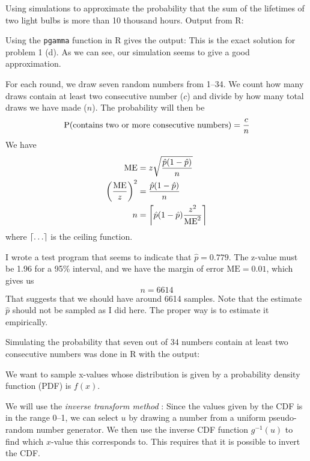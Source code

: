 \documentclass[a4paper,english,12pt]{article}
\begin{document}
Using simulations to approximate the probability that the sum of the lifetimes
of two light bulbs is more than 10 thousand hours. Output from R:

Using the \texttt{pgamma} function in R gives the output:
This is the exact solution for problem 1 (d). As we can see, our simulation
seems to give a good approximation.

For each round, we draw seven random numbers from 1--34. We count how many
draws contain at least two consecutive number ($c$) and divide by how many
total draws we have made ($n$). The probability will then be
\[
  \Prb(\text{contains two or more consecutive numbers}) = \frac{c}{n}
\]
We have
\begin{align*}
  \text{ME} &= z\sqrt{\frac{\hat{p}(1-\hat{p})}{n}} \\
  \left(\frac{\text{ME}}{z}\right)^2 &= \frac{\hat{p}(1-\hat{p})}{n} \\
  n &= \ceil*{ \hat{p}(1-\hat{p}) \frac{z^2}{\text{ME}^2} }
\end{align*}
where $\ceil{\dots}$ is the ceiling function.

I wrote a test program that seems to indicate that $\hat{p} = 0.779$. The
z-value must be 1.96 for a 95\%{} interval, and we have the margin of error
$\text{ME} = 0.01$, which gives us
\[
  n = 6614
\]
That suggests that we should have around 6614 samples. Note that the estimate
$\hat{p}$ should not be sampled as I did here. The proper way is to estimate it
empirically.

Simulating the probability that seven out of 34 numbers contain at least two
consecutive numbers was done in R with the output:

\label{problem:3a}
We want to sample x-values whose distribution is given by a probability density
function (PDF) is $f(x)$.

We will use the \textit{inverse transform method}
\cite{wiki:inverse.transform.method}: Since the values given by the CDF is in
the range 0--1, we can select $u$ by drawing a number from a uniform
pseudo-random number generator. We then use the inverse CDF function
$g^{-1}(u)$ to find which $x$-value this corresponds to. This requires that it
is possible to invert the CDF.
\end{document}
